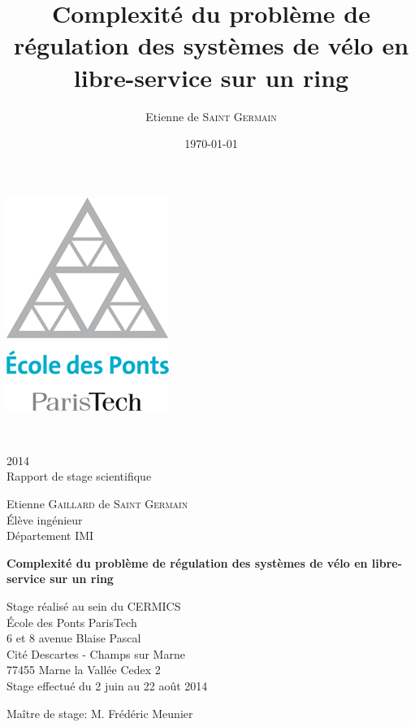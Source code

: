 \documentclass[twoside,11pt,openany,a4paper]{rapport}
\begin{document}
\title{Complexité du problème de régulation des systèmes de vélo en libre-service sur un ring}
\author{Etienne de \textsc{Saint Germain}}
\date{\today}

\mainmatter

\begin{titlepage}
  \begin{center}
    \includegraphics[scale=0.5]{logo_enpc.jpg}
    
    \vspace{0.3cm}
    \\
    
    \vspace{0.7cm}
    2014\\
    Rapport de stage scientifique
    
    \vspace{0.3cm}
    Etienne \textsc{Gaillard} de \textsc{Saint Germain}\\
    Élève ingénieur\\
    Département IMI
    
    \vspace{2cm}
    {\Huge{\textbf{Complexité du problème de régulation des systèmes de vélo en libre-service sur un ring}}}
    
    \vfill
    {\huge{Stage réalisé au sein du CERMICS}}\\
    École des Ponts ParisTech\\
    6 et 8 avenue Blaise Pascal\\
    Cité Descartes - Champs sur Marne\\
    77455 Marne la Vallée Cedex 2\\

    \vspace{0.7cm}
    Stage effectué du 2 juin au 22 août 2014
    
    \vspace{0.3cm}
    Maître de stage: M. Frédéric Meunier

  \end{center}
\end{titlepage}
\end{document}
